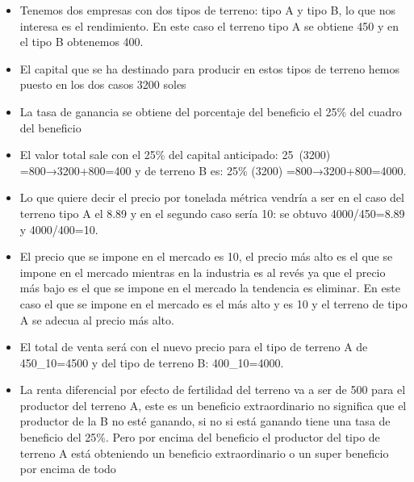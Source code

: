 \documentclass[
  a4paper,
]{article}
\begin{document}
\begin{itemize}
\item
  Tenemos dos empresas con dos tipos de terreno: tipo A y tipo B, lo que
  nos interesa es el rendimiento. En este caso el terreno tipo A se
  obtiene 450 y en el tipo B obtenemos 400.
\item
  El capital que se ha destinado para producir en estos tipos de terreno
  hemos puesto en los dos casos 3200 soles
\item
  La tasa de ganancia se obtiene del porcentaje del beneficio el 25\%
  del cuadro del beneficio
\item
  El valor total sale con el 25\% del capital anticipado: 25\        (3200)
  =800→3200+800=400 y de terreno B es: 25\% (3200) =800→3200+800=4000.
\item
  Lo que quiere decir el precio por tonelada métrica vendría a ser en el
  caso del terreno tipo A el 8.89 y en el segundo caso sería 10: se
  obtuvo 4000/450=8.89 y 4000/400=10.
\item
  El precio que se impone en el mercado es 10, el precio más alto es el
  que se impone en el mercado mientras en la industria es al revés ya
  que el precio más bajo es el que se impone en el mercado la tendencia
  es eliminar. En este caso el que se impone en el mercado es el más
  alto y es 10 y el terreno de tipo A se adecua al precio más alto.
\item
  El total de venta será con el nuevo precio para el tipo de terreno A
  de 450\_10=4500 y del tipo de terreno B: 400\_10=4000.
\item
  La renta diferencial por efecto de fertilidad del terreno va a ser de
  500 para el productor del terreno A, este es un beneficio
  extraordinario no significa que el productor de la B no esté ganando,
  si no si está ganando tiene una tasa de beneficio del 25\%. Pero por
  encima del beneficio el productor del tipo de terreno A está
  obteniendo un beneficio extraordinario o un super beneficio por encima
  de todo
\end{itemize}
\end{document}
